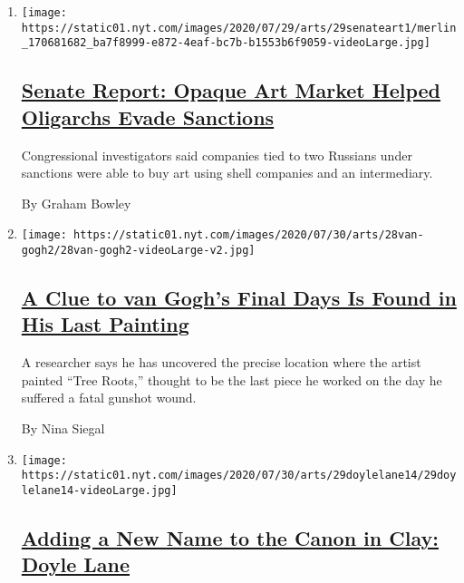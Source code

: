 \begin{enumerate}
\def\labelenumi{\arabic{enumi}.}
\item
  \texttt{[image: https://static01.nyt.com/images/2020/07/29/arts/29senateart1/merlin\_170681682\_ba7f8999-e872-4eaf-bc7b-b1553b6f9059-videoLarge.jpg]}

  \hypertarget{senate-report-opaque-art-market-helped-oligarchs-evade-sanctions}{%
  \subsection{\texorpdfstring{\href{/2020/07/29/arts/design/senate-report-art-market-russia-oligarchs-sanctions.html}{Senate
  Report: Opaque Art Market Helped Oligarchs Evade
  Sanctions}}{Senate Report: Opaque Art Market Helped Oligarchs Evade Sanctions}}\label{senate-report-opaque-art-market-helped-oligarchs-evade-sanctions}}

  Congressional investigators said companies tied to two Russians under
  sanctions were able to buy art using shell companies and an
  intermediary.

  By Graham Bowley
\item
  \texttt{[image: https://static01.nyt.com/images/2020/07/30/arts/28van-gogh2/28van-gogh2-videoLarge-v2.jpg]}

  \hypertarget{a-clue-to-van-goghs-final-days-is-found-in-his-last-painting}{%
  \subsection{\texorpdfstring{\href{/2020/07/28/arts/design/vincent-van-gogh-tree-roots.html}{A
  Clue to van Gogh's Final Days Is Found in His Last
  Painting}}{A Clue to van Gogh's Final Days Is Found in His Last Painting}}\label{a-clue-to-van-goghs-final-days-is-found-in-his-last-painting}}

  A researcher says he has uncovered the precise location where the
  artist painted ``Tree Roots,'' thought to be the last piece he worked
  on the day he suffered a fatal gunshot wound.

  By Nina Siegal
\item
  \texttt{[image: https://static01.nyt.com/images/2020/07/30/arts/29doylelane14/29doylelane14-videoLarge.jpg]}

  \hypertarget{adding-a-new-name-to-the-canon-in-clay-doyle-lane}{%
  \subsection{\texorpdfstring{\href{/2020/07/29/arts/design/doyle-lane-ceramics.html}{Adding
  a New Name to the Canon in Clay: Doyle
  Lane}}{Adding a New Name to the Canon in Clay: Doyle Lane}}\label{adding-a-new-name-to-the-canon-in-clay-doyle-lane}}


\end{enumerate}
